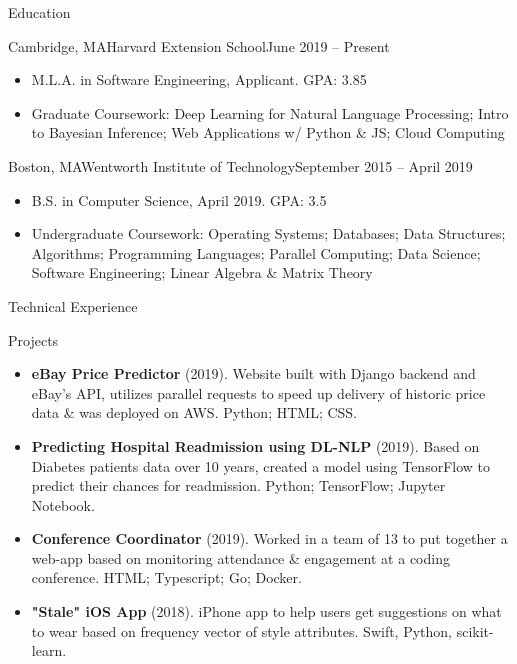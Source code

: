\documentclass[]{mcdowellcv}
\begin{document}
	\begin{cvsection}{Education}
		\begin{cvsubsection}{Cambridge, MA}{Harvard Extension School}{June 2019 -- Present}
		
			\begin{itemize}
				\item M.L.A. in Software Engineering, Applicant. GPA: 3.85
				\item Graduate Coursework: Deep Learning for Natural Language Processing; Intro to Bayesian Inference; Web Applications w/ Python \& JS; Cloud Computing
				\end{itemize}
		\end{cvsubsection}
		\begin{cvsubsection}{Boston, MA}{Wentworth Institute of Technology}{September 2015 -- April 2019}
		\vspace{2mm}
			\begin{itemize}
				\item B.S. in Computer Science, April 2019. GPA: 3.5
				\item Undergraduate Coursework: Operating Systems; Databases; Data Structures; Algorithms; Programming Languages; Parallel Computing; Data Science; Software Engineering; Linear Algebra \& Matrix Theory
			\end{itemize}
		\end{cvsubsection}
	\end{cvsection}
	
	\begin{cvsection}{Technical Experience}
		\begin{cvsubsection}{Projects}{}{}
			\begin{itemize}
				\item \textbf{eBay Price Predictor} (2019). Website built with Django backend and eBay's API, utilizes parallel requests to speed up delivery of historic price data \& was deployed on AWS. Python; HTML; CSS.
				\item \textbf{Predicting Hospital Readmission using DL-NLP} (2019). Based on Diabetes patients data over 10 years, created a model using TensorFlow to predict their chances for readmission. Python; TensorFlow; Jupyter Notebook.
				\item \textbf{Conference Coordinator} (2019). Worked in a team of 13 to put together a web-app based on monitoring attendance \& engagement at a coding conference. HTML; Typescript; Go; Docker.
				\item \textbf{"Stale" iOS App} (2018). iPhone app to help users get suggestions on what to wear based on frequency vector of style attributes. Swift, Python, scikit-learn.
			\end{itemize}
		\end{cvsubsection}
	\end{cvsection}
	
\end{document}
